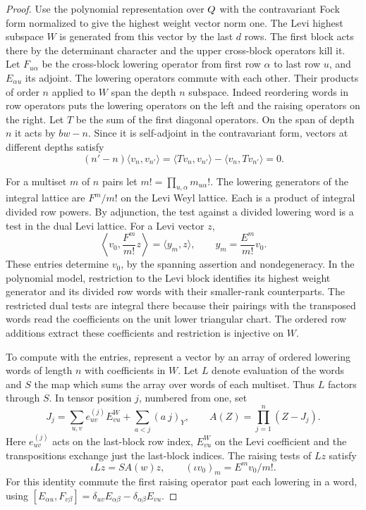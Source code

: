 \begin{proof}
Use the polynomial representation over \(Q\) with the
contravariant Fock form normalized to give the highest
weight vector norm one. The Levi highest subspace \(W\)
is generated from this vector by the last \(d\) rows. The
first block acts there by the determinant character and the
upper cross-block operators kill it. Let \(F_{u\alpha}\)
be the cross-block lowering operator from first row \(\alpha\)
to last row \(u\), and \(E_{\alpha u}\) its adjoint.
The lowering operators commute with each other. Their products
of order \(n\) applied to \(W\) span the depth \(n\) subspace.
Indeed reordering words in row operators puts the lowering
operators on the left and the raising operators on the right.
Let \(T\) be the sum of the first diagonal operators. On the span of depth \(n\) it acts by \(bw-n\). Since it is self-adjoint in the contravariant form, vectors at different depths satisfy
\[
 (n'-n)\langle v_n,v_{n'}\rangle=\langle Tv_n,v_{n'}\rangle-\langle v_n,Tv_{n'}\rangle=0 .
\]

For a multiset \(m\) of \(n\) pairs let
\(m!=\prod_{u,\alpha}m_{u\alpha}!\).
The lowering generators of the integral lattice are
\(F^m/m!\) on the Levi Weyl lattice. Each is a product of
integral divided row powers. By adjunction, the test against a divided lowering word is a test in the dual Levi lattice. For a Levi vector \(z\),
\[
 \left\langle v_0,\frac{F^m}{m!}z\right\rangle =\langle y_m,z\rangle,\qquad y_m=\frac{E^m}{m!}v_0.
\]
These entries determine \(v_0\), by the spanning assertion
and nondegeneracy. In the polynomial model, restriction to
the Levi block identifies its highest weight generator and
its divided row words with their smaller-rank counterparts.
The restricted dual tests are integral there because their pairings
with the transposed words read the coefficients on the unit
lower triangular chart. The ordered row additions extract
these coefficients and restriction is injective on \(W\).
\label{cor:lift-pieri-cost-2}

To compute with the entries, represent a vector by an array
of ordered lowering words of length \(n\) with coefficients
in \(W\). Let \(L\) denote evaluation of the words and \(S\)
the map which sums the array over words of each multiset.
Thus \(L\) factors through \(S\). In tensor position \(j\),
numbered from one, set
\[
 J_j=\sum_{u,v}e^{(j)}_{uv}E^W_{vu}
                       +\sum_{a<j}(a\ j)_Y ,
 \qquad A(Z)=\prod_{j=1}^n(Z-J_j).
\]
Here \(e^{(j)}_{uv}\) acts on the last-block row index,
\(E^W_{vu}\) on the Levi coefficient and the transpositions
exchange just the last-block indices. The raising tests of
\(Lz\) satisfy
\[
                    \iota Lz=S A(w) z,\qquad
                    (\iota v_0)_m=E^m v_0/m! .
\]
For this identity commute the first raising operator past
each lowering in a word, using
\([E_{\alpha u},F_{v\beta}]
  =\delta_{uv}E_{\alpha\beta}-\delta_{\alpha\beta}E_{vu}\).


\end{proof}
